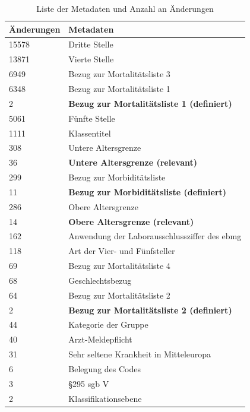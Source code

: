 \begin{table}[ht]
	\centering
	\small
	\caption[Änderungen in den Metadaten]{Liste der Metadaten und Anzahl an Änderungen}
	\label{tab:icdupd}
	\begin{tabular}{|l|p{11.5cm}|}
		\hline
		\rowcolor{lightgray} Änderungen & Metadaten \\ \hline
		15578 & Dritte Stelle \\ \hline
		13871 & Vierte Stelle \\ \hline
		6949 & Bezug zur Mortalitätsliste 3 \\ \hline		
		6348 & Bezug zur Mortalitätsliste 1 \\ \hline
		2 & \textbf{Bezug zur Mortalitätsliste 1 (definiert)} \\ \hline
		5061 & Fünfte Stelle \\ \hline
		1111 & Klassentitel \\ \hline
		308 & Untere Altersgrenze \\ \hline
		36 & \textbf{Untere Altersgrenze (relevant)} \\ \hline
		299 & Bezug zur Morbiditätsliste \\ \hline
		11 & \textbf{Bezug zur Morbiditätsliste (definiert)} \\ \hline
		286 & Obere Altersgrenze \\ \hline
		14 & \textbf{Obere Altersgrenze (relevant)} \\ \hline
		162 & Anwendung der Laborausschlussziffer des \ac{ebmg} \\ \hline
		118 & Art der Vier- und Fünfsteller \\ \hline
		69 & Bezug zur Mortalitätsliste 4 \\ \hline
		68 & Geschlechtsbezug \\ \hline
		64 & Bezug zur Mortalitätsliste 2 \\ \hline
		2 & \textbf{Bezug zur Mortalitätsliste 2 (definiert)} \\ \hline
		44 & Kategorie der Gruppe \\ \hline
		40 & Arzt-Meldepflicht \\ \hline		
		31 & Sehr seltene Krankheit in Mitteleuropa \\ \hline				
		6 & Belegung des Codes \\ \hline
		3 & \S 295 \ac{sgb} V \\ \hline		
		2 & Klassifikationsebene \\ \hline
		
	\end{tabular}
\end{table}

